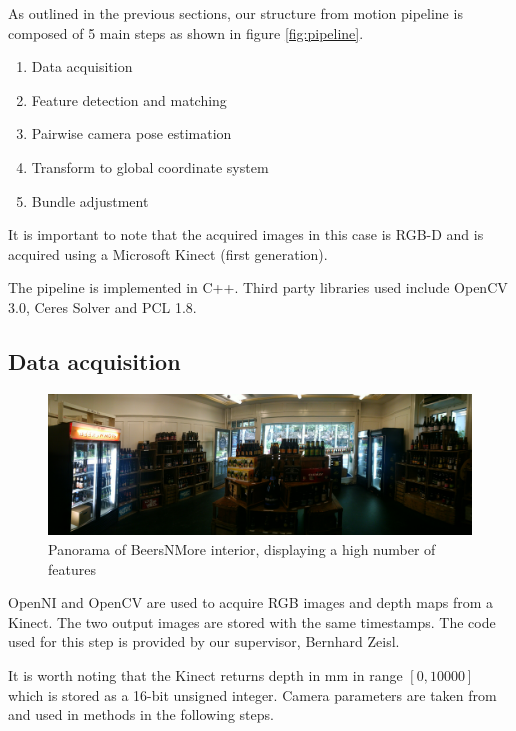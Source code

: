 \documentclass[10pt,twocolumn,letterpaper]{article}
\begin{document}
As outlined in the previous sections, our structure from motion pipeline is
composed of 5 main steps as shown in figure \ref{fig:pipeline}.

\begin{enumerate}
\item Data acquisition
\item Feature detection and matching
\item Pairwise camera pose estimation
\item Transform to global coordinate system
\item Bundle adjustment
\end{enumerate}

It is important to note that the acquired images in this case is RGB-D and is
acquired using a Microsoft Kinect (first generation).

The pipeline is implemented in C++. Third party libraries used include OpenCV
3.0, Ceres Solver and PCL 1.8.


\subsection{Data acquisition}
\begin{figure}
\begin{center}
   \includegraphics[width=0.9\linewidth]{figures/BeersNMore_panorama.jpg}
\end{center}
\caption{Panorama of BeersNMore interior, displaying a high number of features}
\label{fig:panorama}
\end{figure}
OpenNI and OpenCV are used to acquire RGB images and depth maps from a Kinect.
The two output images are stored with the same timestamps. The code used for
this step is provided by our supervisor, Bernhard Zeisl.

It is worth noting that the Kinect returns depth in mm in range $[0, 10000]$
which is stored as a 16-bit unsigned integer. Camera parameters are taken from
\cite{smisek20133d} and used in methods in the following steps.
\end{document}
